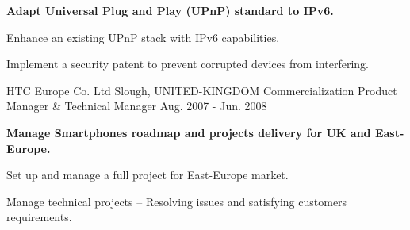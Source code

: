 \begin{cventries}
{\begin{cvitems}
        \item {\textbf{Adapt Universal Plug and Play (UPnP) standard to IPv6.}}
        \item {Enhance an existing UPnP stack with IPv6 capabilities.}
        \item {Implement a security patent to prevent corrupted devices from interfering.}
      \end{cvitems}
    }
  \cventry
    {HTC Europe Co. Ltd}
    {Slough, UNITED-KINGDOM}
    {Commercialization Product Manager \& Technical Manager}
    {Aug. 2007 - Jun. 2008}
    {
      \begin{cvitems}
        \item {\textbf{Manage Smartphones roadmap and projects delivery for UK and East-Europe.}}
        \item {Set up and manage a full project for East-Europe market.}
        \item {Manage technical projects -- Resolving issues and satisfying customers requirements.}
      \end{cvitems}
    }
  
\end{cventries}
